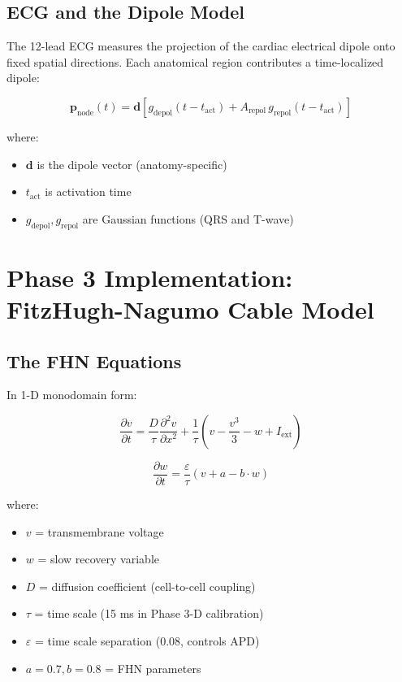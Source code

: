 \documentclass[12pt,a4paper]{article}
\begin{document}
\subsection{ECG and the Dipole Model}

The 12-lead ECG measures the projection of the cardiac electrical dipole onto fixed spatial directions. Each anatomical region contributes a time-localized dipole:

$$\mathbf{p}_{\text{node}}(t) = \mathbf{d} \left[ g_{\text{depol}}(t-t_{\text{act}}) + A_{\text{repol}} \, g_{\text{repol}}(t-t_{\text{act}}) \right]$$

where:
\begin{itemize}
    \item $\mathbf{d}$ is the dipole vector (anatomy-specific)
    \item $t_{\text{act}}$ is activation time
    \item $g_{\text{depol}}, g_{\text{repol}}$ are Gaussian functions (QRS and T-wave)
\end{itemize}

\section{Phase 3 Implementation: FitzHugh-Nagumo Cable Model}

\subsection{The FHN Equations}

In 1-D monodomain form:

$$\frac{\partial v}{\partial t} = \frac{D}{\tau} \frac{\partial^2 v}{\partial x^2} + \frac{1}{\tau} \left( v - \frac{v^3}{3} - w + I_{\text{ext}} \right)$$

$$\frac{\partial w}{\partial t} = \frac{\varepsilon}{\tau} \left( v + a - b \cdot w \right)$$

where:
\begin{itemize}
    \item $v$ = transmembrane voltage
    \item $w$ = slow recovery variable
    \item $D$ = diffusion coefficient (cell-to-cell coupling)
    \item $\tau$ = time scale (15 ms in Phase 3-D calibration)
    \item $\varepsilon$ = time scale separation (0.08, controls APD)
    \item $a = 0.7, b = 0.8$ = FHN parameters
\end{itemize}
\end{document}
